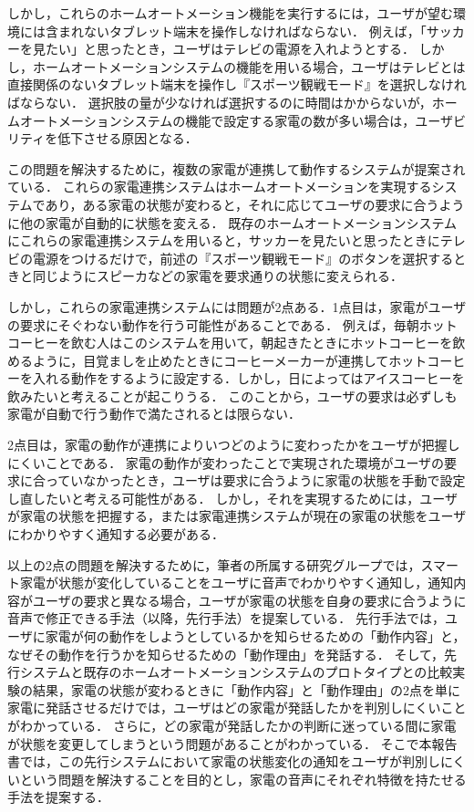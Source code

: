 \documentclass[a4j,12pt,twoside]{jreport}
\begin{document}
しかし，これらのホームオートメーション機能を実行するには，ユーザが望む環境には含まれないタブレット端末を操作しなければならない．
例えば，「サッカーを見たい」と思ったとき，ユーザはテレビの電源を入れようとする．
しかし，ホームオートメーションシステムの機能を用いる場合，ユーザはテレビとは直接関係のないタブレット端末を操作し『スポーツ観戦モード』を選択しなければならない．
選択肢の量が少なければ選択するのに時間はかからないが，ホームオートメーションシステムの機能で設定する家電の数が多い場合は，ユーザビリティを低下させる原因となる．

この問題を解決するために，複数の家電が連携して動作するシステムが提案されている\cite{denshin}\cite{Hitach}．
これらの家電連携システムはホームオートメーションを実現するシステムであり，ある家電の状態が変わると，それに応じてユーザの要求に合うように他の家電が自動的に状態を変える．
既存のホームオートメーションシステムにこれらの家電連携システムを用いると，サッカーを見たいと思ったときにテレビの電源をつけるだけで，前述の『スポーツ観戦モード』のボタンを選択するときと同じようにスピーカなどの家電を要求通りの状態に変えられる．

しかし，これらの家電連携システムには問題が2点ある．1点目は，家電がユーザの要求にそぐわない動作を行う可能性があることである．
例えば，毎朝ホットコーヒーを飲む人はこのシステムを用いて，朝起きたときにホットコーヒーを飲めるように，目覚ましを止めたときにコーヒーメーカーが連携してホットコーヒーを入れる動作をするように設定する．しかし，日によってはアイスコーヒーを飲みたいと考えることが起こりうる．
このことから，ユーザの要求は必ずしも家電が自動で行う動作で満たされるとは限らない．

2点目は，家電の動作が連携によりいつどのように変わったかをユーザが把握しにくいことである．
家電の動作が変わったことで実現された環境がユーザの要求に合っていなかったとき，ユーザは要求に合うように家電の状態を手動で設定し直したいと考える可能性がある．
しかし，それを実現するためには，ユーザが家電の状態を把握する，または家電連携システムが現在の家電の状態をユーザにわかりやすく通知する必要がある．

以上の2点の問題を解決するために，筆者の所属する研究グループでは，スマート家電が状態が変化していることをユーザに音声でわかりやすく通知し，通知内容がユーザの要求と異なる場合，ユーザが家電の状態を自身の要求に合うように音声で修正できる手法（以降，先行手法\cite{sumi}）を提案している．
先行手法では，ユーザに家電が何の動作をしようとしているかを知らせるための「動作内容」と，なぜその動作を行うかを知らせるための「動作理由」を発話する．
そして，先行システムと既存のホームオートメーションシステムのプロトタイプとの比較実験の結果，家電の状態が変わるときに「動作内容」と「動作理由」の2点を単に家電に発話させるだけでは，ユーザはどの家電が発話したかを判別しにくいことがわかっている．
さらに，どの家電が発話したかの判断に迷っている間に家電が状態を変更してしまうという問題があることがわかっている．
そこで本報告書では，この先行システムにおいて家電の状態変化の通知をユーザが判別しにくいという問題を解決することを目的とし，家電の音声にそれぞれ特徴を持たせる手法を提案する．
\end{document}
